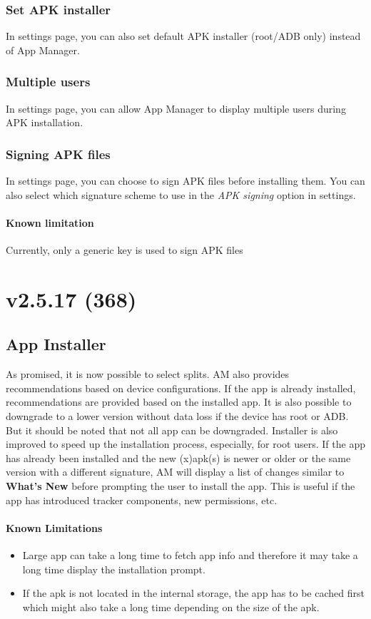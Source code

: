 \subsubsection{Set APK installer}
In settings page, you can also set default APK installer (root/ADB only) instead of App Manager.

\subsubsection{Multiple users}
In settings page, you can allow App Manager to display multiple users during APK installation.

\subsubsection{Signing APK files}
In settings page, you can choose to sign APK files before installing them. You can also select which signature scheme
to use in the \textit{APK signing} option in settings.

\paragraph{Known limitation} Currently, only a generic key is used to sign APK files


\section{v2.5.17 (368)}

\subsection{App Installer}
As promised, it is now possible to select splits. AM also provides recommendations based on device configurations.
If the app is already installed, recommendations are provided based on the installed app. It is also possible to
downgrade to a lower version without data loss if the device has root or ADB. But it should be noted that not all app
can be downgraded. Installer is also improved to speed up the installation process, especially, for root users.
If the app has already been installed and the new (x)apk(s) is newer or older or the same version with a different
signature, AM will display a list of changes similar to \textbf{What's New} before prompting the user to install
the app. This is useful if the app has introduced tracker components, new permissions, etc.

\paragraph{Known Limitations}
\begin{itemize}
    \item Large app can take a long time to fetch app info and therefore it may take a long time display the installation prompt.
    \item If the apk is not located in the internal storage, the app has to be cached first which might also take
    a long time depending on the size of the apk.
\end{itemize}

